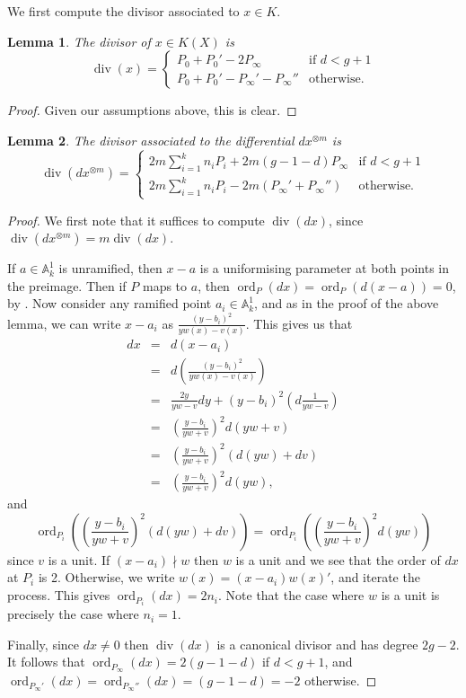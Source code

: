 \documentclass[11pt]{article} %
\newtheorem{lem}{Lemma}
\theoremstyle{remark}\newtheorem*{rem}{Remark}
\DeclareMathOperator{\ord}{ord}
\DeclareMathOperator{\di}{div}
\begin{document}
We first compute the divisor associated to $x\in K$.

\begin{lem}
 The divisor of $x\in K(X)$ is 
 \[
  \di (x)= \left\{ 
  \begin{array}{ll}
    P_0+P_0' - 2P_{\infty} & \mbox{if } d<g+1\\
    P_0+P_0' - P_{\infty}' - P_{\infty}'' & \mbox{otherwise.}
  \end{array}\right.
\]
\end{lem}
\begin{proof}
 Given our assumptions above, this is clear.
\end{proof}

\begin{lem}
 The divisor associated to the differential $dx^{\otimes m}$ is 
 \[
  \di (dx^{\otimes m}) = \left\{ 
  \begin{array}{ll}
   2m\sum_{i=1}^k n_iP_i + 2m(g-1-d)P_{\infty} & \mbox{if } d<g+1\\
   2m\sum_{i=1}^k n_iP_i - 2m(P_{\infty}' + P_{\infty}'') & \mbox{otherwise.}
  \end{array}\right.
 \]
\end{lem}
\begin{proof}
 We first note that it suffices to compute $\di (dx)$, since $\di (dx^{\otimes m}) = m\di (dx)$.

 If $a\in \mathbb A_k^1$ is unramified, then $x-a$ is a uniformising parameter at both points in the preimage.
Then if $P$ maps to $a$, then $\ord_P(dx)=\ord_P(d(x-a))=0$, by \cite[\S 8.5]{fulton}.
Now consider any ramified point $a_i\in \mathbb A_k^1$, and as in the proof of the above lemma, we can write $x-a_i$ as $\frac{(y-b_i)^2}{yw(x)-v(x)}$.
This gives us that
\begin{eqnarray*}
 dx & = & d(x-a_i) \\
 & = & d \left( \frac{(y-b_i)^2}{yw(x)-v(x)} \right) \\
 & = & \frac{2y}{yw-v} dy + (y-b_i)^2\left( d\frac{1}{yw-v}\right)\\
 & = & \left( \frac{y-b_i}{yw+v}\right)^2d(yw+v)\\
 & = & \left( \frac{y-b_i}{yw+v}\right)^2(d(yw)+dv)\\
 & = & \left( \frac{y-b_i}{yw+v}\right)^2d(yw),
 \end{eqnarray*}
 and 
 \[
\ord_{P_i}\left( \left( \frac{y-b_i}{yw+v}\right)^2(d(yw)+dv)\right) = \ord_{P_i}\left( \left( \frac{y-b_i}{yw+v}\right)^2d(yw)\right)
\]
since $v$ is a unit.
If $(x-a_i)\nmid w$ then $w$ is a unit and we see that the order of $dx$ at $P_i$ is 2.
Otherwise, we write $w(x)=(x-a_i)w(x)'$, and iterate the process.
This gives $\ord_{P_i}(dx)=2n_i$.
Note that the case where $w$ is a unit is precisely the case where $n_i=1$.

Finally, since $dx\neq 0$ then $\di (dx)$ is a canonical divisor and has degree $2g-2$.
It follows that $\ord_{P_{\infty}}(dx)=2(g-1-d)$ if $d<g+1$, and $\ord_{P_{\infty}'}(dx) =\ord_{P_{\infty}''}(dx)=(g-1-d) = -2$ otherwise.
 \end{proof}
\end{document}
